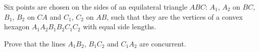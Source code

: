Six points are  chosen on the sides of an equilateral triangle $ABC$: $A_1$,  $A_2$ on $BC$,  $B_1$,  $B_2$ on $CA$ and $C_1$,  $C_2$ on $AB$,  such that they are the vertices of a convex hexagon $A_1A_2B_1B_2C_1C_2$ with equal side lengths.

Prove that the lines $A_1B_2$,  $B_1C_2$ and $C_1A_2$ are concurrent.
